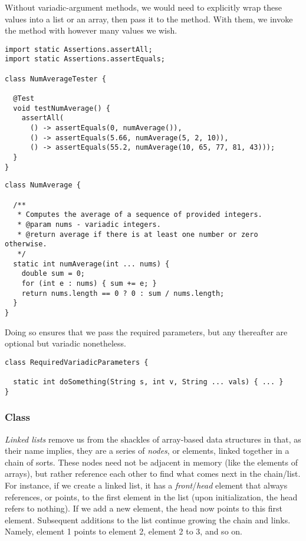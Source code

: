Without variadic-argument methods, we would need to explicitly wrap these values into a list or an array, then pass it to the method. 
With them, we invoke the method with however many values we wish.

\begin{lstlisting}[language=MyJava]
import static Assertions.assertAll;
import static Assertions.assertEquals;

class NumAverageTester {

  @Test
  void testNumAverage() {
    assertAll(
      () -> assertEquals(0, numAverage()),
      () -> assertEquals(5.66, numAverage(5, 2, 10)),
      () -> assertEquals(55.2, numAverage(10, 65, 77, 81, 43)));
  }
}
\end{lstlisting}

\begin{lstlisting}[language=MyJava]
class NumAverage {

  /**
   * Computes the average of a sequence of provided integers.
   * @param nums - variadic integers.
   * @return average if there is at least one number or zero otherwise.
   */
  static int numAverage(int ... nums) {
    double sum = 0;
    for (int e : nums) { sum += e; }
    return nums.length == 0 ? 0 : sum / nums.length;
  }
}
\end{lstlisting}

Doing so ensures that we pass the required parameters, but any thereafter are optional but variadic nonetheless.

\begin{lstlisting}[language=MyJava]
class RequiredVariadicParameters {

  static int doSomething(String s, int v, String ... vals) { ... }
}
\end{lstlisting}

\subsubsection*{ Class}
\emph{Linked lists} remove us from the shackles of array-based data structures in that, as their name implies, they are a series of \emph{nodes}, or elements, linked together in a chain of sorts. 
These nodes need not be adjacent in memory (like the elements of arrays), but rather reference each other to find what comes next in the chain/list. 
For instance, if we create a linked list, it has a \emph{front}/\emph{head} element that always references, or points, to the first element in the list (upon initialization, the head refers to nothing). 
If we add a new element, the head now points to this first element. 
Subsequent additions to the list continue growing the chain and links. 
Namely, element 1 points to element 2, element 2 to 3, and so on. 

